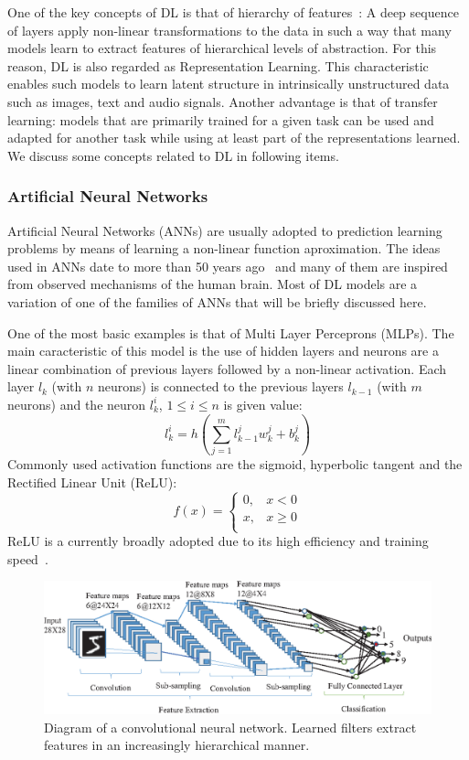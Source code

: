 \documentclass[12pt]{article}
\begin{document}
One of the key concepts of DL is that of hierarchy of features~\cite{ref:dl}:
A deep sequence of layers apply non-linear transformations to the data
in such a way that many models learn to extract features of hierarchical
levels of abstraction.
For this reason, DL is also regarded as Representation Learning.
This characteristic enables such models to learn latent structure
in intrinsically unstructured data such as images, text and audio signals.
Another advantage is that of transfer learning: models that are
primarily trained for a given task can be used and adapted for another
task while using at least part of the representations learned.
We discuss some concepts related to DL in following items.

\subsubsection{Artificial Neural Networks}
Artificial Neural Networks (ANNs) are usually adopted to prediction
learning problems by means of learning a non-linear function aproximation.
The ideas used in ANNs date to more than 50 years ago~\cite{ref:perceptron} and many of them
are inspired from observed mechanisms of the human brain.
Most of DL models are a variation of one of the families of ANNs
that will be briefly discussed here.

One of the most basic examples is that of Multi Layer Perceprons (MLPs).
The main caracteristic of this model is the use of hidden layers
and neurons are a linear combination of previous layers followed by
a non-linear activation.
Each layer $l_k$ (with $n$ neurons) is connected to the previous layers
$l_{k-1}$ (with $m$ neurons) and the neuron $l_k^i$, $1 \le i \le n$
is given value:
$$l_k^i = h\left(\sum_{j=1}^{m} l_{k-1}^jw_k^j + b_k^j\right)$$
Commonly used activation functions are the sigmoid, hyperbolic tangent
and the Rectified Linear Unit (ReLU):
$$f(x) = \begin{cases}
    0, & x < 0 \\
    x, & x \ge 0 \\
        \end{cases}
$$
ReLU is a currently broadly adopted due to its high efficiency
and training speed~\cite{ref:relu}.

\begin{figure}
\begin{center}
    \includegraphics[width=0.9\linewidth]{./img/cnn2.png}
\caption{
    Diagram of a convolutional neural network.
    Learned filters extract features in an increasingly hierarchical manner.
}
\label{fig:cnn}
\end{center}
\end{figure}
\end{document}
